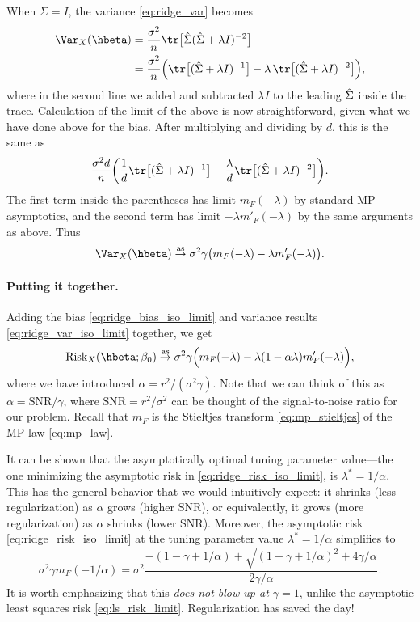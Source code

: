 \documentclass{article}
\begin{document}
When $\Sigma = I$, the variance \eqref{eq:ridge_var} becomes 
\begin{align*}
\Var_X(\hbeta)
&= \frac{\sigma^2}{n} \tr \big[ \hSigma ( \hSigma + \lambda I)^{-2} \big] \\ 
&=\frac{\sigma^2}{n} \Big( \tr \big[ ( \hSigma + \lambda I)^{-1} \big] - 
\lambda \, \tr \big[ (\hSigma + \lambda I)^{-2} \big] \Big),
\end{align*}
where in the second line we added and subtracted $\lambda I$ to the leading
$\hat\Sigma$ inside the trace. Calculation of the limit of the above is now
straightforward, given what we have done above for the bias. After multiplying 
and dividing by $d$, this is the same as 
\[
\frac{\sigma^2 d}{n} \bigg( \frac{1}{d} \tr \big[ ( \hSigma + \lambda I)^{-1} 
\big] - \frac{\lambda}{d} \tr \big[ (\hSigma + \lambda I)^{-2} \big] \bigg).  
\]
The first term inside the parentheses has limit $m_F(-\lambda)$ by standard MP
asymptotics, and the second term has limit $-\lambda m'_F(-\lambda)$ by the same
arguments as above. Thus   
\begin{equation}
\label{eq:ridge_var_iso_limit}
\Var_X(\hbeta) \asto \sigma^2 \gamma \big( m_F(-\lambda) - \lambda 
m'_F(-\lambda) \big).
\end{equation}

\paragraph{Putting it together.}

Adding the bias \eqref{eq:ridge_bias_iso_limit} and variance results
\eqref{eq:ridge_var_iso_limit} together, we get
\begin{equation}
\label{eq:ridge_risk_iso_limit}
\Risk_X(\hbeta; \beta_0) \asto \sigma^2 \gamma 
\Big( m_F(-\lambda) - \lambda (1 - \alpha \lambda) m'_F(-\lambda) \Big), 
\end{equation}
where we have introduced $\alpha = r^2 / (\sigma^2 \gamma)$. Note that we can
think of this as $\alpha = \mathrm{SNR} / \gamma$, where $\mathrm{SNR} = r^2 /
\sigma^2$ can be thought of the signal-to-noise ratio for our problem. Recall
that $m_F$ is the Stieltjes transform \eqref{eq:mp_stieltjes} of the MP law
\eqref{eq:mp_law}. 

It can be shown that the asymptotically optimal tuning parameter value---the one
minimizing the asymptotic risk in \eqref{eq:ridge_risk_iso_limit}, is $\lambda^*
= 1/\alpha$. This has the general behavior that we would intuitively expect: it
shrinks (less regularization) as $\alpha$ grows (higher SNR), or equivalently,
it grows (more regularization) as $\alpha$ shrinks (lower SNR). Moreover, the
asymptotic risk \eqref{eq:ridge_risk_iso_limit} at the tuning parameter value
$\lambda^* = 1/\alpha$ simplifies to      
\[
\sigma^2 \gamma m_F(-1/\alpha) = \sigma^2 \frac{-(1 - \gamma + 1/\alpha) + 
  \sqrt{(1 - \gamma + 1/\alpha)^2 + 4\gamma / \alpha}}{2\gamma /\alpha}.     
\]
It is worth emphasizing that this \emph{does not blow up at $\gamma = 1$}, 
unlike the asymptotic least squares risk \eqref{eq:ls_risk_limit}. 
Regularization has saved the day! 
\end{document}
